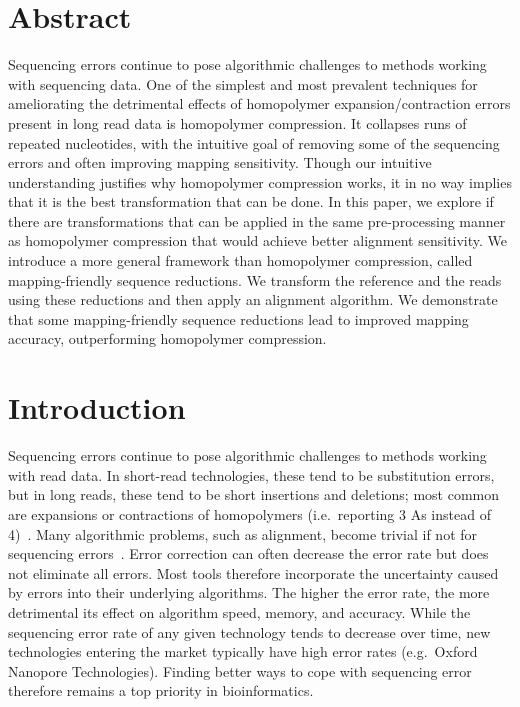\documentclass[
  11,
]{scrbook}
\begin{document}
\hypertarget{hpc-abstract}{%
\section*{Abstract}\label{hpc-abstract}}

Sequencing errors continue to pose algorithmic challenges to methods
working with sequencing data. One of the simplest and most prevalent
techniques for ameliorating the detrimental effects of homopolymer
expansion/contraction errors present in long read data is homopolymer
compression. It collapses runs of repeated nucleotides, with the
intuitive goal of removing some of the sequencing errors and often
improving mapping sensitivity. Though our intuitive understanding
justifies why homopolymer compression works, it in no way implies that
it is the best transformation that can be done. In this paper, we
explore if there are transformations that can be applied in the same
pre-processing manner as homopolymer compression that would achieve
better alignment sensitivity. We introduce a more general framework than
homopolymer compression, called mapping-friendly sequence reductions. We
transform the reference and the reads using these reductions and then
apply an alignment algorithm. We demonstrate that some mapping-friendly
sequence reductions lead to improved mapping accuracy, outperforming
homopolymer compression.

\hypertarget{introduction-1}{%
\section{Introduction}\label{introduction-1}}

Sequencing errors continue to pose algorithmic challenges to methods
working with read data. In short-read technologies, these tend to be
substitution errors, but in long reads, these tend to be short
insertions and deletions; most common are expansions or contractions of
homopolymers (i.e.~reporting 3 As instead of
4)~\autocite{dohmBenchmarkingLongreadCorrection2020}. Many algorithmic problems,
such as alignment, become trivial if not for sequencing
errors~\autocite{gusfieldbook}. Error correction can often decrease the error
rate but does not eliminate all errors. Most tools therefore incorporate
the uncertainty caused by errors into their underlying algorithms. The
higher the error rate, the more detrimental its effect on algorithm
speed, memory, and accuracy. While the sequencing error rate of any
given technology tends to decrease over time, new technologies entering
the market typically have high error rates (e.g.~Oxford Nanopore
Technologies). Finding better ways to cope with sequencing error
therefore remains a top priority in bioinformatics.
\end{document}
